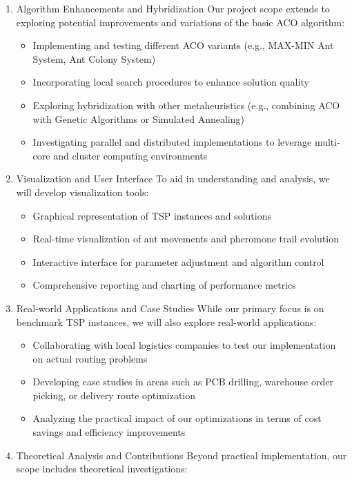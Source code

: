 \documentclass[
]{article}
\begin{document}
\begin{enumerate}
\def\labelenumi{\arabic{enumi}.}
\setcounter{enumi}{5}
\item
  Algorithm Enhancements and Hybridization Our project scope extends to
  exploring potential improvements and variations of the basic ACO
  algorithm:

  \begin{itemize}
  \item
    Implementing and testing different ACO variants (e.g., MAX-MIN Ant
    System, Ant Colony System)
  \item
    Incorporating local search procedures to enhance solution quality
  \item
    Exploring hybridization with other metaheuristics (e.g., combining
    ACO with Genetic Algorithms or Simulated Annealing)
  \item
    Investigating parallel and distributed implementations to leverage
    multi-core and cluster computing environments
  \end{itemize}
\item
  Visualization and User Interface To aid in understanding and analysis,
  we will develop visualization tools:

  \begin{itemize}
  \item
    Graphical representation of TSP instances and solutions
  \item
    Real-time visualization of ant movements and pheromone trail
    evolution
  \item
    Interactive interface for parameter adjustment and algorithm control
  \item
    Comprehensive reporting and charting of performance metrics
  \end{itemize}
\item
  Real-world Applications and Case Studies While our primary focus is on
  benchmark TSP instances, we will also explore real-world applications:

  \begin{itemize}
  \item
    Collaborating with local logistics companies to test our
    implementation on actual routing problems
  \item
    Developing case studies in areas such as PCB drilling, warehouse
    order picking, or delivery route optimization
  \item
    Analyzing the practical impact of our optimizations in terms of cost
    savings and efficiency improvements
  \end{itemize}
\item
  Theoretical Analysis and Contributions Beyond practical
  implementation, our scope includes theoretical investigations:


\end{enumerate}
\end{document}
